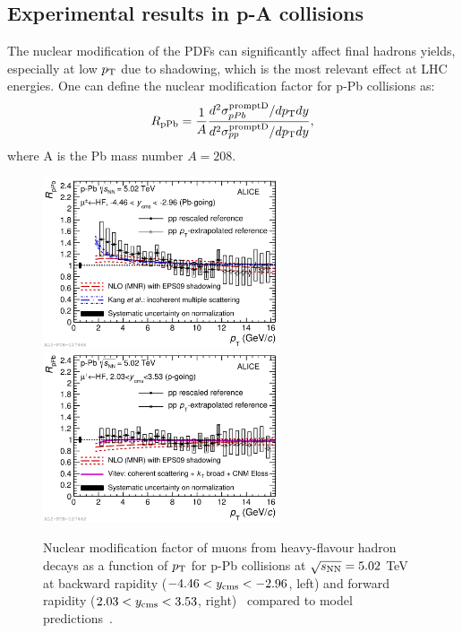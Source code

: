 \subsection{Experimental results in p-A collisions}
\label{sec:HFresultspA}
The nuclear modification of the PDFs can significantly affect final hadrons yields,
especially at low $p_{\rm T}$ due to shadowing, which is the most relevant effect at LHC energies.
One can define the nuclear modification factor for p-Pb collisions as:
\begin{equation}
R_{\rm pPb} = \frac{1}{A}\frac{d^2\sigma_{pPb}^{\rm prompt D}/dp_{\rm T} dy}{d^2\sigma_{pp}^{\rm prompt D}/dp_{\rm T} dy},
\end{equation}
where A is the Pb mass number $A = 208$. \\
\begin{figure}[!ht]
  \centering
  \includegraphics[width=7cm]{FigCap2/2017-Feb-05-Fig2b.pdf}
  \includegraphics[width=7cm]{FigCap2/2017-Feb-05-Fig2a.pdf}
  \caption{Nuclear modification factor of muons from heavy-flavour hadron decays as a function of $p_{\rm T}$ for p-Pb collisions at $\sqrt{s_{\rm NN}} = 5.02$ TeV at backward rapidity ($-4.46 < y_{\rm cms} < -2.96$, left) and forward rapidity ($2.03 < y_{\rm cms} < 3.53$, right)~\cite{Acharya:2017hdv} compared to model predictions~\cite{Kang:2014hha,Mangano:1991jk}. }
  \label{fig:muons}
\end{figure}
